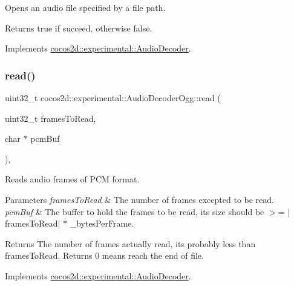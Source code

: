 Opens an audio file specified by a file path. 

\begin{DoxyReturn}{Returns}
true if succeed, otherwise false. 
\end{DoxyReturn}


Implements \hyperlink{classcocos2d_1_1experimental_1_1AudioDecoder_a27747e5f9671a16852997fe852e28e71}{cocos2d\+::experimental\+::\+Audio\+Decoder}.

\mbox{\label{classcocos2d_1_1experimental_1_1AudioDecoderOgg_ae0bc8e6b0efdf11ec12235c4095bb3b1}} 
\subsubsection{\texorpdfstring{read()}{read()}}
{\footnotesize\ttfamily uint32\+\_\+t cocos2d\+::experimental\+::\+Audio\+Decoder\+Ogg\+::read (\begin{DoxyParamCaption}\item[{uint32\+\_\+t}]{frames\+To\+Read,  }\item[{char $\ast$}]{pcm\+Buf }\end{DoxyParamCaption})\hspace{0.3cm}{\ttfamily [override]}, {\ttfamily [virtual]}}



Reads audio frames of P\+CM format. 


\begin{DoxyParams}{Parameters}
{\em frames\+To\+Read} & The number of frames excepted to be read. \\
\hline
{\em pcm\+Buf} & The buffer to hold the frames to be read, its size should be $>$= $\vert$frames\+To\+Read$\vert$ $\ast$ \+\_\+bytes\+Per\+Frame. \\
\hline
\end{DoxyParams}
\begin{DoxyReturn}{Returns}
The number of frames actually read, it\textquotesingle{}s probably less than \textquotesingle{}frames\+To\+Read\textquotesingle{}. Returns 0 means reach the end of file. 
\end{DoxyReturn}


Implements \hyperlink{classcocos2d_1_1experimental_1_1AudioDecoder_a952b42c3785402bac2166c8dd1af543c}{cocos2d\+::experimental\+::\+Audio\+Decoder}.

